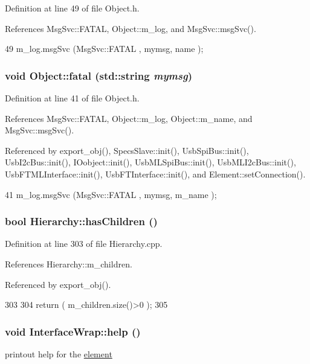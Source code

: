 Definition at line 49 of file Object.h.

References MsgSvc::FATAL, Object::m\_\-log, and MsgSvc::msgSvc().


\begin{DoxyCode}
49 { m_log.msgSvc (MsgSvc::FATAL   , mymsg, name ); }
\end{DoxyCode}
\hypertarget{classObject_aad5a16aac7516ce65bd5ec02ab07fc80}{
\subsubsection[{fatal}]{\setlength{\rightskip}{0pt plus 5cm}void Object::fatal (std::string {\em mymsg})}}
\label{classObject_aad5a16aac7516ce65bd5ec02ab07fc80}


Definition at line 41 of file Object.h.

References MsgSvc::FATAL, Object::m\_\-log, Object::m\_\-name, and MsgSvc::msgSvc().

Referenced by export\_\-obj(), SpecsSlave::init(), UsbSpiBus::init(), UsbI2cBus::init(), IOobject::init(), UsbMLSpiBus::init(), UsbMLI2cBus::init(), UsbFTMLInterface::init(), UsbFTInterface::init(), and Element::setConnection().


\begin{DoxyCode}
41 { m_log.msgSvc (MsgSvc::FATAL   , mymsg, m_name ); }
\end{DoxyCode}
\hypertarget{classHierarchy_a255174fe4d316d2a3f430dcb9dab29f1}{
\subsubsection[{hasChildren}]{\setlength{\rightskip}{0pt plus 5cm}bool Hierarchy::hasChildren ()}}
\label{classHierarchy_a255174fe4d316d2a3f430dcb9dab29f1}


Definition at line 303 of file Hierarchy.cpp.

References Hierarchy::m\_\-children.

Referenced by export\_\-obj().


\begin{DoxyCode}
303                               {
304   return ( m_children.size()>0 );
305 }
\end{DoxyCode}
\hypertarget{structInterfaceWrap_abcf87065a7b9099a7d05e7c0ddaf2487}{
\subsubsection[{help}]{\setlength{\rightskip}{0pt plus 5cm}void InterfaceWrap::help ()}}
\label{structInterfaceWrap_abcf87065a7b9099a7d05e7c0ddaf2487}
printout help for the \hyperlink{namespaceelement}{element} 

